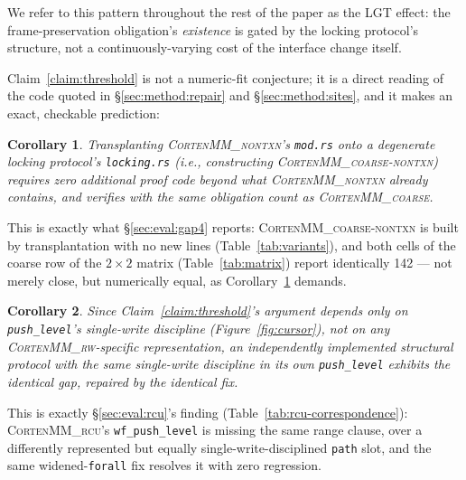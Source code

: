 \documentclass[10pt]{article}
\newtheorem{corollary}{Corollary}
\newcommand{\corten}[1]{\textsc{CortenMM\_#1}}
\newcommand{\vfn}[1]{\texttt{#1}}
\begin{document}
We refer to this pattern throughout the rest of the paper as the LGT
effect: the frame-preservation obligation's \emph{existence} is gated
by the locking protocol's structure, not a continuously-varying cost
of the interface change itself.

Claim~\ref{claim:threshold} is not a numeric-fit conjecture; it is a
direct reading of the code quoted in \S\ref{sec:method:repair} and
\S\ref{sec:method:sites}, and it makes an exact, checkable prediction:

\begin{corollary}
\label{cor:coarse-nontxn}
Transplanting \corten{nontxn}'s \vfn{mod.rs} onto a degenerate locking
protocol's \vfn{locking.rs} (i.e., constructing \corten{coarse-nontxn})
requires \emph{zero} additional proof code beyond what
\corten{nontxn} already contains, and verifies with the same obligation
count as \corten{coarse}.
\end{corollary}

This is exactly what \S\ref{sec:eval:gap4} reports: \corten{coarse-nontxn}
is built by transplantation with no new lines (Table~\ref{tab:variants}),
and both cells of the coarse row of the $2{\times}2$ matrix
(Table~\ref{tab:matrix}) report identically 142 --- not merely close,
but numerically equal, as Corollary~\ref{cor:coarse-nontxn} demands.

\begin{corollary}
\label{cor:rcu-same-fix}
Since Claim~\ref{claim:threshold}'s argument depends only on
\vfn{push\_level}'s single-write discipline (Figure~\ref{fig:cursor}),
not on any \corten{rw}-specific representation, an independently
implemented structural protocol with the same single-write discipline
in its own \vfn{push\_level} exhibits the identical gap, repaired by
the identical fix.
\end{corollary}

This is exactly \S\ref{sec:eval:rcu}'s finding
(Table~\ref{tab:rcu-correspondence}): \corten{rcu}'s
\vfn{wf\_push\_level} is missing the same range clause, over a
differently represented but equally single-write-disciplined
\vfn{path} slot, and the same widened-\vfn{forall} fix resolves it with
zero regression.
\end{document}

